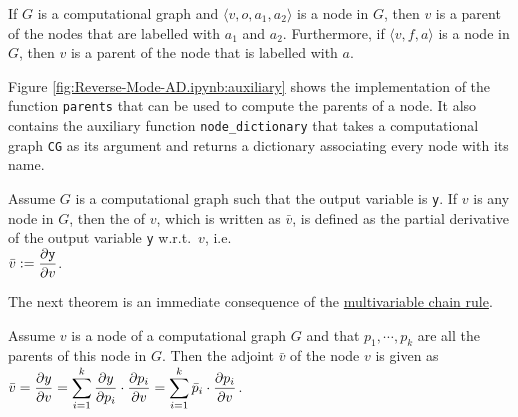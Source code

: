 \begin{Definition}[Parent]
  If $G$ is a computational graph and $\langle v, o, a_1, a_2\rangle$ is a node in $G$, then $v$ is a parent
  of the nodes that are labelled with $a_1$ and $a_2$.  Furthermore, if $\langle v, f, a\rangle$ is a node in
  $G$, then $v$ is a parent of the node that is labelled with $a$.
  \eoxs
\end{Definition}

Figure \ref{fig:Reverse-Mode-AD.ipynb:auxiliary} shows the implementation of the function \texttt{parents}
that can be used to compute the parents of a node.  It also contains the auxiliary function
\texttt{node\_dictionary} that takes a computational graph \texttt{CG} as its argument and returns a dictionary
associating every node with its name.
\FloatBarrier

\begin{Definition}[Adjoint]
  Assume $G$ is a computational graph such that the output variable is \texttt{y}.
  If $v$ is any node in $G$, then the   of $v$, which is written as $\bar{v}$, is defined
  as the partial derivative of the output variable \texttt{y} w.r.t.~$v$, i.e.
  \\[0.2cm]
  \hspace*{1.3cm}
  $\displaystyle\bar{v} := \frac{\partial \mathtt{y}}{\partial v}$.  \eoxs
\end{Definition}

\noindent
The next theorem is an immediate consequence of the 
\href{https://en.wikipedia.org/wiki/Chain_rule#Multivariable_case}{multivariable chain rule}.

\begin{Theorem}
  Assume $v$ is a node of a computational graph $G$ and that $p_1, \cdots, p_k$ are all the parents of this node
  in $G$. Then the adjoint $\bar{v}$ of the node $v$
  is given as
  \\[0.2cm]
  \hspace*{1.3cm}
  $\displaystyle\bar{v} = \frac{\partial y}{\partial v} 
              = \sum\limits_{i=1}^k \frac{\partial y}{\partial p_i} \cdot \frac{\partial p_i}{\partial v}
              = \sum\limits_{i=1}^k \bar{p}_i \cdot \frac{\partial p_i}{\partial v}
  $.
\end{Theorem}

